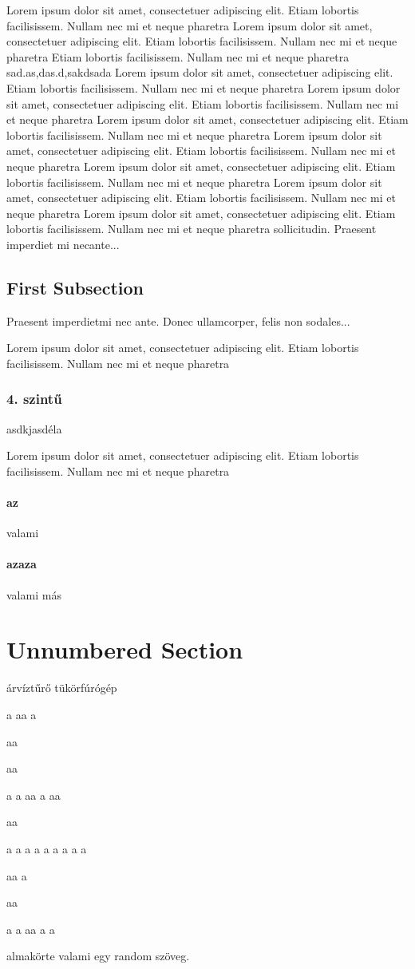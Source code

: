 \documentclass[12pt, a4paper]{book}
\begin{document}
Lorem ipsum dolor sit amet, consectetuer adipiscing elit.  
Etiam lobortis facilisissem.  Nullam nec mi et neque pharetra  
Lorem ipsum dolor sit amet, consectetuer adipiscing elit.  
Etiam lobortis facilisissem.  Nullam nec mi et neque pharetra Etiam lobortis facilisissem.  Nullam nec mi et neque pharetra 
 sad.as,das.d,sakdsada
Lorem ipsum dolor sit amet, consectetuer adipiscing elit.  
Etiam lobortis facilisissem.  Nullam nec mi et neque pharetra  
Lorem ipsum dolor sit amet, consectetuer adipiscing elit.  
Etiam lobortis facilisissem.  Nullam nec mi et neque pharetra  
Lorem ipsum dolor sit amet, consectetuer adipiscing elit.  
Etiam lobortis facilisissem.  Nullam nec mi et neque pharetra  
Lorem ipsum dolor sit amet, consectetuer adipiscing elit.  
Etiam lobortis facilisissem.  Nullam nec mi et neque pharetra  
Lorem ipsum dolor sit amet, consectetuer adipiscing elit.  
Etiam lobortis facilisissem.  Nullam nec mi et neque pharetra  
Lorem ipsum dolor sit amet, consectetuer adipiscing elit.  
Etiam lobortis facilisissem.  Nullam nec mi et neque pharetra  
Lorem ipsum dolor sit amet, consectetuer adipiscing elit.  
Etiam lobortis facilisissem.  Nullam nec mi et neque pharetra sollicitudin.  Praesent imperdiet mi necante...
 
\subsection{First Subsection}
Praesent imperdietmi nec ante. Donec ullamcorper, felis non sodales...
 
Lorem ipsum dolor sit amet, consectetuer adipiscing elit.  
Etiam lobortis facilisissem.  Nullam nec mi et neque pharetra 
\subsubsection{4. szintű}
asdkjasdéla
 
Lorem ipsum dolor sit amet, consectetuer adipiscing elit.  
Etiam lobortis facilisissem.  Nullam nec mi et neque pharetra 
\paragraph{az}
valami 
\paragraph{azaza} 
valami más
 
\section*{Unnumbered Section}
árvíztűrő tükörfúrógép

a
aa
a

aa

aa

a
a
aa
a
aa

aa

a
a
a
a
a
a
a
a
a

aa
a

aa

a
a
aa
a
a


almakörte valami egy random szöveg.
\end{document}
